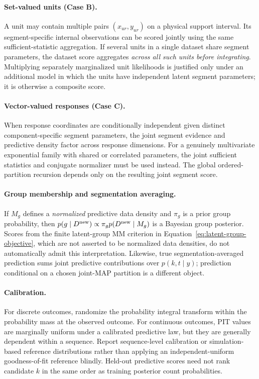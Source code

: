 \paragraph{Set-valued units (Case B).}
A unit may contain multiple pairs $(x_{ur},y_{ur})$ on a physical support interval. Its segment-specific internal observations can be scored jointly using the same sufficient-statistic aggregation. If several units in a single dataset share segment parameters, the dataset score aggregates \emph{across all such units before integrating}. Multiplying separately marginalized unit likelihoods is justified only under an additional model in which the units have independent latent segment parameters; it is otherwise a composite score.

\paragraph{Vector-valued responses (Case C).}
When response coordinates are conditionally independent given distinct component-specific segment parameters, the joint segment evidence and predictive density factor across response dimensions. For a genuinely multivariate exponential family with shared or correlated parameters, the joint sufficient statistics and conjugate normalizer must be used instead. The global ordered-partition recursion depends only on the resulting joint segment score.

\paragraph{Group membership and segmentation averaging.}
If $M_g$ defines a \emph{normalized} predictive data density and $\pi_g$ is a prior group probability, then $p(g\mid D^{\rm new})\propto\pi_gp(D^{\rm new}\mid M_g)$ is a Bayesian group posterior. Scores from the finite latent-group MM criterion in Equation~\eqref{eq:latent-group-objective}, which are not asserted to be normalized data densities, do not automatically admit this interpretation. Likewise, true segmentation-averaged prediction sums joint predictive contributions over $p(k,t\mid y)$; prediction conditional on a chosen joint-MAP partition is a different object.

\paragraph{Calibration.}
For discrete outcomes, randomize the probability integral transform within the probability mass at the observed outcome. For continuous outcomes, PIT values are marginally uniform under a calibrated predictive law, but they are generally dependent within a sequence. Report sequence-level calibration or simulation-based reference distributions rather than applying an independent-uniform goodness-of-fit reference blindly. Held-out predictive scores need not rank candidate $k$ in the same order as training posterior count probabilities.
